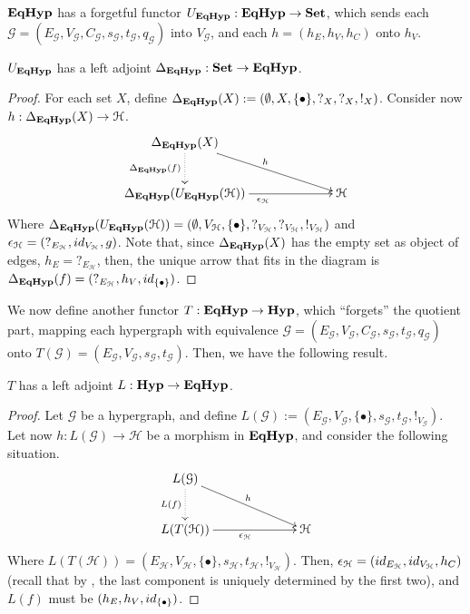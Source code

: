 $\textbf{\textup{EqHyp}}$ has a forgetful functor $U_{\textbf{\textup{EqHyp}}}:\textbf{\textup{EqHyp}} \to \mathbf{Set}$, which sends each $\mathcal{G} = (E_\mathcal{G}, V_{\mathcal{G}}, C_\mathcal{G}, s_\mathcal{G}, t_\mathcal{G}, q_\mathcal{G})$ into $V_\mathcal{G}$, and each $h = (h_E, h_V, h_C)$ onto $h_V$. 

\begin{proposition}
	$U_{\textbf{\textup{EqHyp}}}$ has a left adjoint $\Delta_{\textbf{\textup{EqHyp}}}: \mathbf{Set} \to \textbf{\textup{EqHyp}}$.
\end{proposition}

\begin{proof}
	For each set $X$, define $\Delta_{\textbf{\textup{EqHyp}}}(X):= (\emptyset, X, \{\bullet\}, ?_X, ?_X, !_X)$. Consider now $h: \Delta_{\textbf{\textup{EqHyp}}}(X) \to \mathcal{H}$.
	\[\xymatrix@C=2.3cm{
			\Delta_{\EqHyp}(X) \ar@{.>}[d]_{\Delta_\EqHyp(f)} \ar[dr]^{h} & \\
			\Delta_\EqHyp(U_{\EqHyp}(\mathcal{H})) \ar[r]_{\epsilon_{\mathcal{H}}} & \mathcal{H}
	}\]
	Where $\Delta_{\textbf{\textup{EqHyp}}}(U_{\textbf{\textup{EqHyp}}}(\mathcal{H})) = (\emptyset, V_\mathcal{H}, \{\bullet\}, ?_{V_\mathcal{H}}, ?_{V_\mathcal{H}}, !_{V_\mathcal{H}})$ and $\epsilon_{\mathcal{H}} = (?_{E_\mathcal{H}}, \id{V_\mathcal{H}}, g)$.
	Note that, since $\Delta_{\textbf{\textup{EqHyp}}}(X)$ has the empty set as object of edges, $h_E = ?_{E_\mathcal{H}}$, then, the unique arrow that fits in the diagram is $\Delta_{\EqHyp}(f) = (?_{E_\mathcal{H}}, h_V, \id{\{\bullet\}})$.

\end{proof}

We now define another functor $T: \textbf{\textup{EqHyp}} \to \textbf{\textup{Hyp}}$, which ``forgets'' the quotient part, mapping each hypergraph with equivalence $\mathcal{G} = (E_\mathcal{G}, V_{\mathcal{G}}, C_\mathcal{G}, s_\mathcal{G}, t_\mathcal{G}, q_\mathcal{G})$ onto $T(\mathcal{G})=(E_{\mathcal{G}}, V_{\mathcal{G}}, s_\mathcal{G}, t_{\mathcal{G}})$. Then, we have the following result.

\begin{proposition}
	$T$ has a left adjoint $L: \textbf{\textup{Hyp}} \to \textbf{\textup{EqHyp}}$.
\end{proposition}

\begin{proof}
	Let $\mathcal{G}$ be a hypergraph, and define $L(\mathcal{G}) := (E_\mathcal{G}, V_{\mathcal{G}}, \{\bullet\}, s_\mathcal{G}, t_\mathcal{G}, !_{V_\mathcal{G}})$. Let now $h: L(\mathcal{G})\to \mathcal{H}$ be a morphism in $\textbf{\textup{EqHyp}}$, and consider the following situation.
	\[\xymatrix@C=2.3cm{
		L(\mathcal{G}) \ar@{.>}[d]_{L(f)} \ar[dr]^{h}\\ L(T(\mathcal{H})) \ar[r]_{\epsilon_{\mathcal{H}}} & \mathcal{H}
	}\]
	Where $L(T(\mathcal{H}))=(E_\mathcal{H}, V_{\mathcal{H}}, \{\bullet\}, s_\mathcal{H}, t_\mathcal{H}, !_{V_\mathcal{H}})$. Then, $\epsilon_\mathcal{H} = (\id{E_\mathcal{H}}, \id{V_\mathcal{H}}, h_C)$ (recall that by , the last component is uniquely determined by the first two), and $L(f)$ must be $(h_E, h_V, \id{\{\bullet\}})$.
\end{proof}

